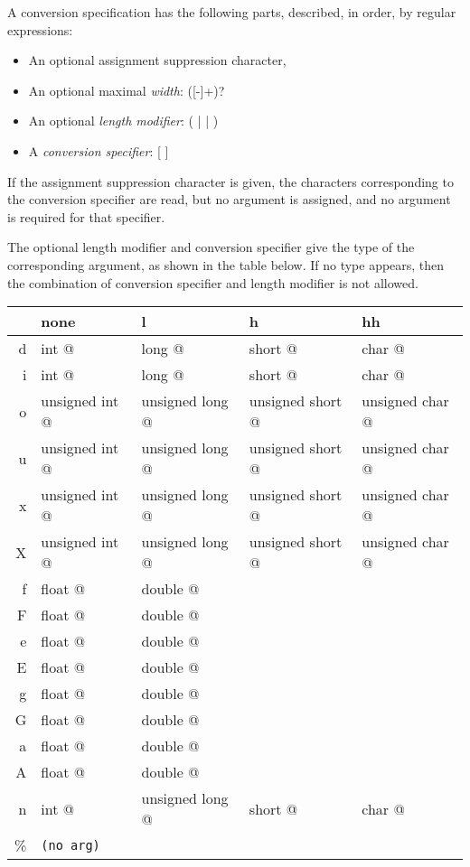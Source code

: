 A conversion specification has the following parts, described, in order,
by regular expressions:
\begin{itemize}
\item An optional assignment suppression character, \code{*}
\item An optional maximal \emph{width}:
([-]+)?
\item An optional \emph{length modifier}:
( |  |  )
\item A \emph{conversion specifier}:
[               \code{\%}]
\end{itemize}

If the assignment suppression character \code{*} is given, the
characters corresponding to the conversion specifier are read, but no
argument is assigned, and no argument is required for that specifier.

The optional length modifier and conversion specifier give the type of
the corresponding argument, as shown in the table below.  If no type
appears, then the combination of conversion specifier and length
modifier is not allowed.

\begin{tt}
\begin{tabular}{r|llll}
  & none           & l               & h                &  hh\\\hline
d & int @          & long @          & short @          & char @ \\
i & int @          & long @          & short @          & char @ \\
o & unsigned int @ & unsigned long @ & unsigned short @ & unsigned char @ \\
u & unsigned int @ & unsigned long @ & unsigned short @ & unsigned char @ \\
x & unsigned int @ & unsigned long @ & unsigned short @ & unsigned char @ \\
X & unsigned int @ & unsigned long @ & unsigned short @ & unsigned char @ \\
f & float @        & double @ \\
F & float @        & double @ \\
e & float @        & double @ \\
E & float @        & double @ \\
g & float @        & double @ \\
G & float @        & double @ \\
a & float @        & double @ \\
A & float @        & double @ \\
n & int @          & unsigned long @ & short @          & char @ \\
\% & \texttt{(no arg)}
\end{tabular}
\end{tt}

